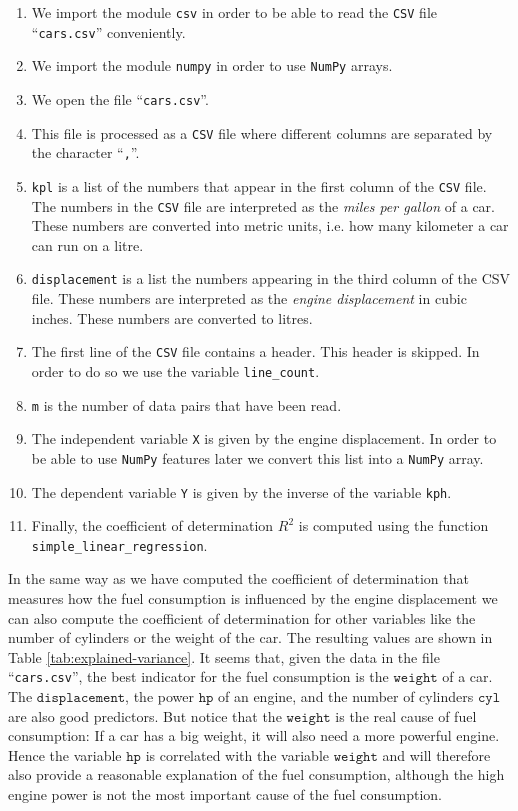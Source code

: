 \begin{enumerate}
\item We import the module \texttt{csv} in order to be able to read the \texttt{CSV} file ``\texttt{cars.csv}''
      conveniently.
\item We import the module \texttt{numpy} in order to use \texttt{NumPy} arrays.
\item We open the file ``\texttt{cars.csv}''.
\item This file is processed as a \texttt{CSV} file where different columns are separated by the character 
      ``\texttt{,}''.
\item \texttt{kpl} is a list of the numbers that appear in the first column of the \texttt{CSV} file.
      The numbers in the \texttt{CSV} file are interpreted as the \emph{miles per gallon} of a car.
      These numbers are converted into metric units, i.e. how many kilometer a car can run on a litre.
\item \texttt{displacement} is a list the numbers appearing in the third column of the \textsc{CSV} file.
      These numbers are interpreted as the \emph{engine displacement} in cubic inches.
      These numbers are converted to litres.
\item The first line of the \texttt{CSV} file contains a header.  This header is skipped.
      In order to do so we use the variable \texttt{line\_count}.
\item \texttt{m} is the number of data pairs that have been read.
\item The independent variable \texttt{X} is given by the engine displacement. 
      In order to be able to use \texttt{NumPy} features later we convert this list into a \texttt{NumPy} array.
\item The dependent variable \texttt{Y} is given by the inverse of the variable \texttt{kph}.
\item Finally, the coefficient of determination $R^2$ is computed using the function \texttt{simple\_linear\_regression}.
\end{enumerate}
In the same way as we have computed the coefficient of determination that measures how the fuel consumption is
influenced by the engine displacement we can also compute the coefficient of determination for other variables
like the number of cylinders or the weight of the car.  
The resulting values are shown in Table \ref{tab:explained-variance}.  It
seems that, given the data in the file ``\texttt{cars.csv}'', the best indicator for the fuel consumption is
the $\mathtt{weight}$ of a car.  The $\mathtt{displacement}$, the power $\mathtt{hp}$ of an engine, and the
number of cylinders $\mathtt{cyl}$ are also good predictors.  But notice that the $\mathtt{weight}$ is the real
cause of fuel consumption:  If a car has a big weight, it will also need a more powerful engine.  Hence the
variable $\mathtt{hp}$ is correlated with the variable $\mathtt{weight}$ and will therefore also provide a
reasonable explanation of the fuel consumption, although the high engine power is not the most important cause
of the fuel consumption. 


